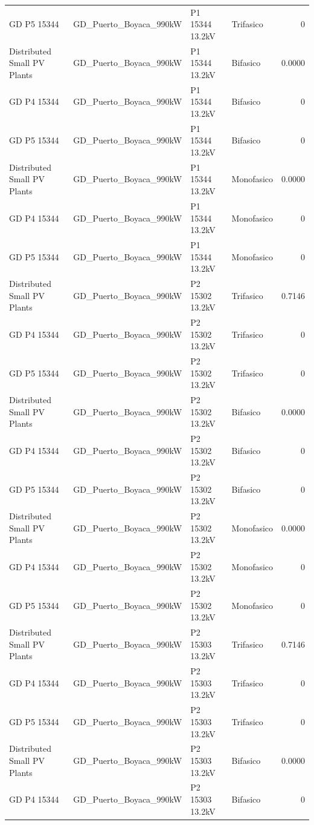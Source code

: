 \documentclass[11pt,a4paper]{article}
\begin{document}
\begin{longtable}{llllr}
GD P5 15344 & GD\_Puerto\_Boyaca\_990kW & P1 15344 13.2kV & Trifasico & 0 \\
Distributed Small PV Plants & GD\_Puerto\_Boyaca\_990kW & P1 15344 13.2kV & Bifasico & 0.0000 \\
GD P4 15344 & GD\_Puerto\_Boyaca\_990kW & P1 15344 13.2kV & Bifasico & 0 \\
GD P5 15344 & GD\_Puerto\_Boyaca\_990kW & P1 15344 13.2kV & Bifasico & 0 \\
Distributed Small PV Plants & GD\_Puerto\_Boyaca\_990kW & P1 15344 13.2kV & Monofasico & 0.0000 \\
GD P4 15344 & GD\_Puerto\_Boyaca\_990kW & P1 15344 13.2kV & Monofasico & 0 \\
GD P5 15344 & GD\_Puerto\_Boyaca\_990kW & P1 15344 13.2kV & Monofasico & 0 \\
Distributed Small PV Plants & GD\_Puerto\_Boyaca\_990kW & P2 15302 13.2kV & Trifasico & 0.7146 \\
GD P4 15344 & GD\_Puerto\_Boyaca\_990kW & P2 15302 13.2kV & Trifasico & 0 \\
GD P5 15344 & GD\_Puerto\_Boyaca\_990kW & P2 15302 13.2kV & Trifasico & 0 \\
Distributed Small PV Plants & GD\_Puerto\_Boyaca\_990kW & P2 15302 13.2kV & Bifasico & 0.0000 \\
GD P4 15344 & GD\_Puerto\_Boyaca\_990kW & P2 15302 13.2kV & Bifasico & 0 \\
GD P5 15344 & GD\_Puerto\_Boyaca\_990kW & P2 15302 13.2kV & Bifasico & 0 \\
Distributed Small PV Plants & GD\_Puerto\_Boyaca\_990kW & P2 15302 13.2kV & Monofasico & 0.0000 \\
GD P4 15344 & GD\_Puerto\_Boyaca\_990kW & P2 15302 13.2kV & Monofasico & 0 \\
GD P5 15344 & GD\_Puerto\_Boyaca\_990kW & P2 15302 13.2kV & Monofasico & 0 \\
Distributed Small PV Plants & GD\_Puerto\_Boyaca\_990kW & P2 15303 13.2kV & Trifasico & 0.7146 \\
GD P4 15344 & GD\_Puerto\_Boyaca\_990kW & P2 15303 13.2kV & Trifasico & 0 \\
GD P5 15344 & GD\_Puerto\_Boyaca\_990kW & P2 15303 13.2kV & Trifasico & 0 \\
Distributed Small PV Plants & GD\_Puerto\_Boyaca\_990kW & P2 15303 13.2kV & Bifasico & 0.0000 \\
GD P4 15344 & GD\_Puerto\_Boyaca\_990kW & P2 15303 13.2kV & Bifasico & 0 \\

\end{longtable}
\end{document}
